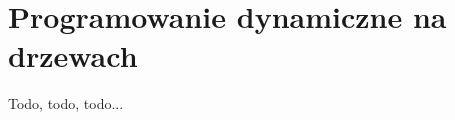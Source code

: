 \section{Programowanie dynamiczne na drzewach}

\label{sec:dynamicznenadrzewach}

Todo, todo, todo...